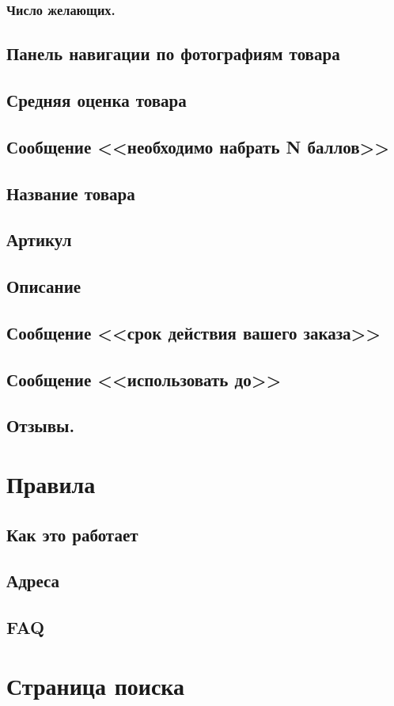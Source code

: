             \subsubsection{Число желающих.}

        \subsection{Панель навигации по фотографиям товара}
        \subsection{Средняя оценка товара}
        \subsection{Сообщение <<необходимо набрать N баллов>>}
        \subsection{Название товара}
        \subsection{Артикул}
        \subsection{Описание}
        \subsection{Сообщение <<срок действия вашего заказа>>}
        \subsection{Сообщение <<использовать до>>}
        \subsection{Отзывы.}

    \section{Правила}
        \subsection{Как это работает}
            \label{sec:rules_hiw}
        \subsection{Адреса}
        \subsection{FAQ}
            \label{sec:page_faq}

    \section{Страница поиска}
        \label{search_page}

